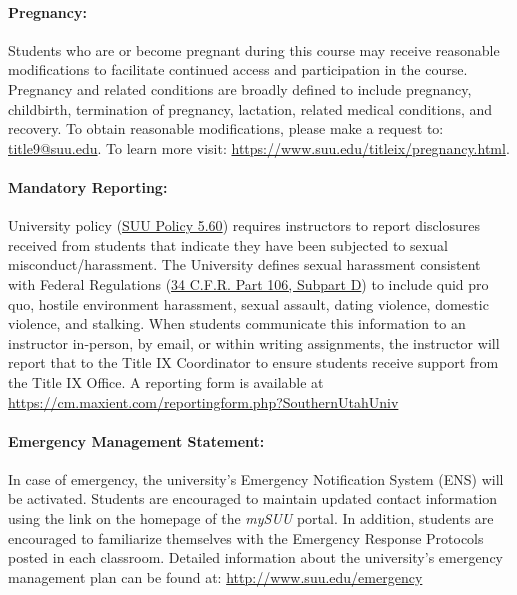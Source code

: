 \documentclass[12pt, letterpaper]{article}
\begin{document}
\paragraph{Pregnancy:}
Students who are or become pregnant during this course may receive reasonable modifications to facilitate continued access and participation in the course. Pregnancy and related conditions are broadly defined to include pregnancy, childbirth, termination of pregnancy, lactation, related medical conditions, and recovery. To obtain reasonable modifications, please make a request to: \href{title9@suu.edu}{title9@suu.edu}. To learn more visit: \href{https://www.suu.edu/titleix/pregnancy.html}{https://www.suu.edu/titleix/pregnancy.html}.

\paragraph{Mandatory Reporting:}
University policy (\href{https://www.suu.edu/policies/05/60.html}{SUU Policy 5.60}) requires instructors to report disclosures received from students that indicate they have been subjected to sexual misconduct/harassment. The University defines sexual harassment consistent with Federal Regulations (\href{https://www.ecfr.gov/current/title-34/subtitle-B/chapter-I/part-106/subpart-D}{34 C.F.R. Part 106, Subpart D}) to include quid pro quo, hostile environment harassment, sexual assault, dating violence, domestic violence, and stalking. When students communicate this information to an instructor in-person, by email, or within writing assignments, the instructor will report that to the Title IX Coordinator to ensure students receive support from the Title IX Office. A reporting form is available at \href{https://cm.maxient.com/reportingform.php?SouthernUtahUniv}{https://cm.maxient.com/reportingform.php?SouthernUtahUniv} 

\paragraph{Emergency Management Statement:}
In case of emergency, the university's Emergency Notification System (ENS) will be activated. Students are encouraged to maintain updated contact information using the link on the homepage of the \emph{mySUU} portal. In addition, students are encouraged to familiarize themselves with the Emergency Response Protocols posted in each classroom. Detailed information about the university's emergency management plan can be found at: \href{http://www.suu.edu/emergency}{http://www.suu.edu/emergency}
\end{document}
